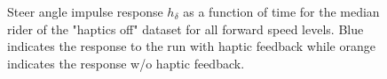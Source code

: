 \begin{figure}[h!]
    \centering
    \caption{Steer angle impulse response \ensuremath{h_\delta} as a function of time for the median rider of the "haptics off" dataset for all forward speed levels. Blue indicates the response to the run with haptic feedback while orange indicates the response w/o haptic feedback.}
\end{figure}
